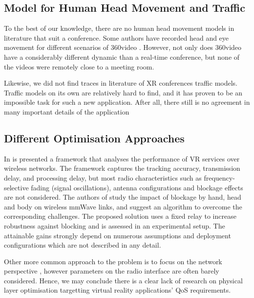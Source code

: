 \subsection*{Model for Human Head Movement and Traffic}

To the best of our knowledge, there are no human head movement models in literature that suit a conference. Some authors have recorded head and eye movement for different scenarios of 360\tdeg video \cite{avtrack360, dataset2}. However, not only does 360\tdeg video have a considerably different dynamic than a real-time conference, but none of the videos were remotely close to a meeting room.

Likewise, we did not find traces in literature of XR conferences traffic models. Traffic models on its own are relatively hard to find, and it has proven to be an impossible task for such a new application. After all, there still is no agreement \cite{3GPP_xr, multi_sensor_tno} in many important details of the application


\subsection*{Different Optimisation Approaches}

In \cite{8395443} is presented a framework that analyses the performance of VR services over wireless networks. The framework captures the tracking accuracy, transmission delay, and processing delay, but most radio characteristics such as frequency-selective fading (signal oscillations), antenna configurations and blockage effects are not considered. The authors of \cite{cutting_the_cord} study the impact of blockage by hand, head and body on wireless \ac{mmWave} links, and suggest an algorithm to overcome the corresponding challenges. The proposed solution uses a fixed relay to increase robustness against blocking and is assessed in an experimental setup. The attainable gains strongly depend on numerous assumptions and deployment configurations which are not described in any detail. 


Other more common approach to the problem is to focus on the network perspective \cite{7997740, 8319985}, however parameters on the radio interface are often barely considered. Hence, we may conclude there is a clear lack of research on physical layer optimisation targetting virtual reality applications' \ac{QoS} requirements. 